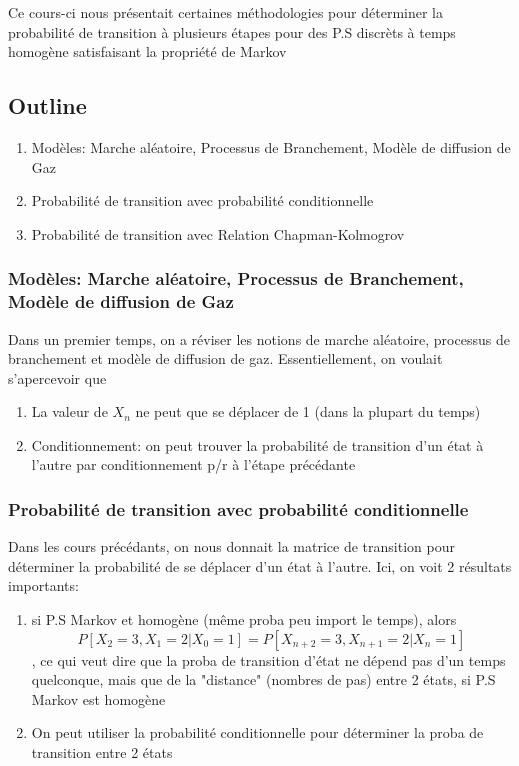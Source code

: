 \documentclass{article}
\begin{document}
Ce cours-ci nous présentait certaines méthodologies pour déterminer
la probabilité de transition à plusieurs étapes pour des P.S discrèts
à temps homogène satisfaisant la propriété de Markov

\subsection*{Outline}
\begin{enumerate}
    \item Modèles: Marche aléatoire, Processus de Branchement, Modèle de
	diffusion de Gaz
    \item Probabilité de transition avec probabilité conditionnelle
    \item Probabilité de transition avec Relation Chapman-Kolmogrov
\end{enumerate}


\subsubsection{Modèles: Marche aléatoire, Processus de Branchement, Modèle de    diffusion de Gaz}

Dans un premier temps, on a réviser les notions de marche aléatoire,
processus de branchement et  modèle de diffusion de gaz. Essentiellement,
on voulait s'apercevoir que
\begin{enumerate}
    \item La valeur de $X_n$ ne peut que se déplacer de 1 (dans la plupart
	du temps)
    \item Conditionnement: on peut trouver la probabilité de transition
	d'un état à l'autre par conditionnement p/r à l'étape précédante
\end{enumerate}

\subsubsection{Probabilité de transition avec probabilité conditionnelle}

Dans les cours précédants, on nous donnait la matrice de transition pour
déterminer la probabilité de se déplacer d'un état à l'autre. Ici, on
voit 2 résultats importants:
\begin{enumerate}
    \item si P.S Markov et homogène (même proba peu import le temps),
	alors $$ P[X_2 = 3 , X_1 = 2 | X_0 = 1] = P[X_{n+2} = 3, X_{n+1} = 2
	| X_n =1] $$, ce qui veut dire que la proba de transition d'état ne
	dépend pas d'un temps quelconque, mais que de la "distance" (nombres
	de pas) entre 2 états, si P.S Markov est homogène
    \item On peut utiliser la probabilité conditionnelle pour déterminer la
	proba de transition entre 2 états
\end{enumerate}
\end{document}
